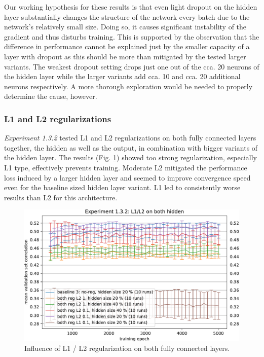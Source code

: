 Our working hypothesis for these results is that even light dropout on the hidden layer substantially changes the structure of the network every batch due to the network’s relatively small size. Doing so, it causes significant instability of the gradient and thus disturbs training. This is supported by the observation that the difference in performance cannot be explained just by the smaller capacity of a layer with dropout as this should be more than mitigated by the tested larger variants. The weakest dropout setting drops just one out of the cca. 20 neurons of the hidden layer while the larger variants add cca. 10 and cca. 20 additional neurons respectively. A more thorough exploration would be needed to properly determine the cause, however.

\subsubsection{L1 and L2 regularizations}

\textit{Experiment 1.3.2} tested L1 and L2 regularizations on both fully connected layers together, the hidden as well as the output, in combination with bigger variants of the hidden layer. The results (Fig. \ref{fig:5.1.3.2}) showed too strong regularization, especially L1 type, effectively prevents training. Moderate L2 mitigated the performance loss induced by a larger hidden layer and seemed to improve convergence speed even for the baseline sized hidden layer variant. L1 led to consistently worse results than L2 for this architecture.

\begin{figure}[H]
    \centering
    \includegraphics[width=1\textwidth]{../figures/05_1_3_2}
    \caption[Experiment 1.3.2]{Influence of L1 / L2 regularization on both fully connected layers.}
    \label{fig:5.1.3.2}
\end{figure}

